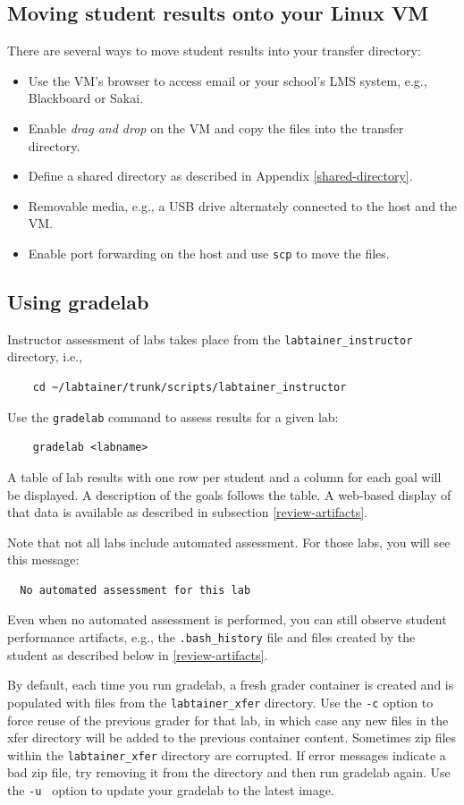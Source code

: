 \documentclass[12pt]{article}
\begin{document}
\subsection{Moving student results onto your Linux VM}
There are several ways to move student results into your transfer directory:
\begin{itemize}
\item Use the VM's browser to access email or your school's LMS system, e.g., Blackboard or Sakai.
\item Enable \textit{drag and drop} on the VM and copy the files into the transfer directory.
\item Define a shared directory as described in Appendix \ref{shared-directory}.
\item Removable media, e.g., a USB drive alternately connected to the host and the VM.
\item Enable port forwarding on the host and use {\tt scp} to move the files.
\end{itemize}

\subsection{Using gradelab}
Instructor assessment of labs takes place from the {\tt labtainer_instructor} directory, i.e.,
\begin{verbatim}
    cd ~/labtainer/trunk/scripts/labtainer_instructor
\end{verbatim}

\noindent Use the {\tt gradelab} command to assess results for a given lab:
\begin{verbatim}
    gradelab <labname>
\end{verbatim}
\noindent A table of lab results with one row per student and
a column for each goal will be displayed.  A description of the goals follows the table.
A web-based display of that data is available as described in subsection \ref{review-artifacts}.

Note that not all labs include automated assessment.  For those labs, you will see this
message:
\begin{verbatim}
  No automated assessment for this lab
\end{verbatim}
\noindent Even when no automated assessment is performed, you can still observe student performance
artifacts, e.g., the {\tt .bash\_history} file and files created by the student as described below in \ref{review-artifacts}.

By default, each time you run gradelab, a fresh grader container is created and is populated with files from the 
{\tt labtainer\_xfer} directory.   Use the {\tt -c} option to force reuse of the previous grader for that lab, in which case
any new files in the xfer directory will be added to the previous container content.
Sometimes zip files within the {\tt labtainer\_xfer} directory are corrupted.  If error messages indicate a bad zip file,
try removing it from the directory and then run gradelab again.
Use the {\tt -u } option to update your gradelab to the latest image.
\end{document}
